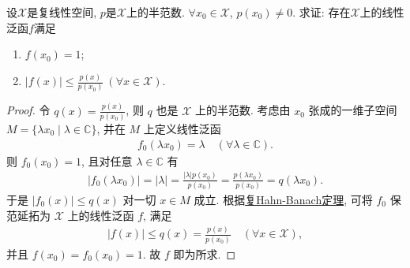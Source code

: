 \documentclass[../../main.tex]{subfiles}%
\begin{document}
\begin{example}
设$\mathscr{X}$是复线性空间, $p$是$\mathscr{X}$上的半范数. $\forall x_0 \in \mathscr{X}$, $p(x_0) \neq 0$. 求证: 存在$\mathscr{X}$上的线性泛函$f$满足
\begin{enumerate}[(1)]
\item $f(x_0) = 1$;
\item $|f(x)| \leqslant \frac{p(x)}{p(x_0)} \ (\forall x \in \mathscr{X})$.
\end{enumerate}
\end{example}
\begin{proof}
令 $q(x) = \frac{p(x)}{p(x_0)}$, 则 $q$ 也是 $\mathscr{X}$ 上的半范数. 考虑由 $x_0$ 张成的一维子空间 $M = \{\lambda x_0 \mid \lambda \in \mathbb{C}\}$, 并在 $M$ 上定义线性泛函
\begin{align*}
f_0(\lambda x_0) = \lambda \quad (\forall \lambda \in \mathbb{C}).
\end{align*}
则 $f_0(x_0) = 1$, 且对任意 $\lambda \in \mathbb{C}$ 有
\begin{align*}
|f_0(\lambda x_0)| = |\lambda| = \frac{|\lambda| p(x_0)}{p(x_0)} = \frac{p(\lambda x_0)}{p(x_0)} = q(\lambda x_0).
\end{align*}
于是 $|f_0(x)| \leqslant q(x)$ 对一切 $x \in M$ 成立. 根据\hyperref[theorem:泛函分析--复Hahn-Banach定理]{复Hahn-Banach定理}, 可将 $f_0$ 保范延拓为 $\mathscr{X}$ 上的线性泛函 $f$, 满足
\begin{align*}
|f(x)| \leqslant q(x) = \frac{p(x)}{p(x_0)} \quad (\forall x \in \mathscr{X}),
\end{align*}
并且 $f(x_0) = f_0(x_0) = 1$. 故 $f$ 即为所求.
\end{proof}
\end{document}
